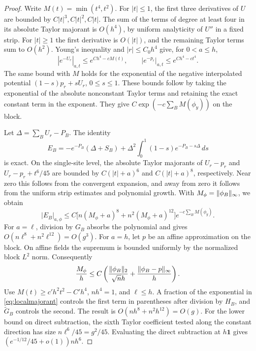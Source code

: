 \documentclass[11pt]{article}
\DeclarePairedDelimiter{\norm}{\lVert}{\rVert}
\begin{document}
\begin{proof}
Write \(M(t)=\min(t^4,t^2)\). For \(|t|\le1\), the first three derivatives of \(U\) are bounded by \(C|t|^3,C|t|^2,C|t|\). The sum of the terms of degree at least four in its absolute Taylor majorant is \(O(h^4)\), by uniform analyticity of \(U''\) in a fixed strip. For \(|t|\ge1\) the first derivative is \(O(|t|)\), and the remaining Taylor terms sum to \(O(h^2)\). Young's inequality and \(|r|\le C_0h^4\) give, for \(0<a\le h\),
\[
 |e^{-U_r}|_{a,t}\le e^{Ch^4-cM(t)},\qquad
 |e^{-p_r}|_{a,t}\le e^{Ch^4-ct^4}.
\]
The same bound with \(M\) holds for the exponential of the negative interpolated potential \((1-s)p_r+sU_r\), \(0\le s\le1\). These bounds follow by taking the exponential of the absolute nonconstant Taylor terms and retaining the exact constant term in the exponent. They give \(C\exp(-c\sum_B M(\phi_y))\) on the block.

Let \(\Delta=\sum_B U_r-P_B\). The identity
\[
 E_B=-e^{-P_B}(\Delta+S_B)
       +\Delta^2\int_0^1(1-s)e^{-P_B-s\Delta}\,ds
\]
is exact. On the single-site level, the absolute Taylor majorants of \(U_r-p_r\) and \(U_r-p_r+t^6/45\) are bounded by \(C(|t|+a)^6\) and \(C(|t|+a)^8\), respectively. Near zero this follows from the convergent expansion, and away from zero it follows from the uniform strip estimates and polynomial growth. With \(M_\phi=\norm{\phi_B}_\infty\), we obtain
\begin{equation}\label{eq:localmajorant}
 |E_B|_{a,\phi}\le C\big[n(M_\phi+a)^8+n^2(M_\phi+a)^{12}\big]
                              e^{-c\sum_B M(\phi_y)}.
\end{equation}
For \(a=\ell\), division by \(G_B\) absorbs the polynomial and gives \(O(n\ell^8+n^2\ell^{12})=O(g^3)\). For \(a=h\), let \(p\) be an affine approximation on the block. On affine fields the supremum is bounded uniformly by the normalized block \(L^2\) norm. Consequently
\[
 \frac{M_\phi}{h}
 \le C\left(\frac{\norm{\phi_B}_2}{\sqrt n h}
      +\frac{\norm{\phi_B-p}_\infty}{h}\right).
\]
Use \(M(t)\ge c'h^2t^2-C'h^4\), \(nh^4=1\), and \(\ell\le h\). A fraction of the exponential in \eqref{eq:localmajorant} controls the first term in parentheses after division by \(H_B\), and \(\widetilde G_B\) controls the second. The result is \(O(nh^8+n^2h^{12})=O(g)\). For the lower bound on direct subtraction, the sixth Taylor coefficient tested along the constant direction has size \(n\ell^6/45=g^2/45\). Evaluating the direct subtraction at \(h\mathbf 1\) gives \((e^{-1/12}/45+o(1))nh^6\).
\end{proof}
\end{document}
